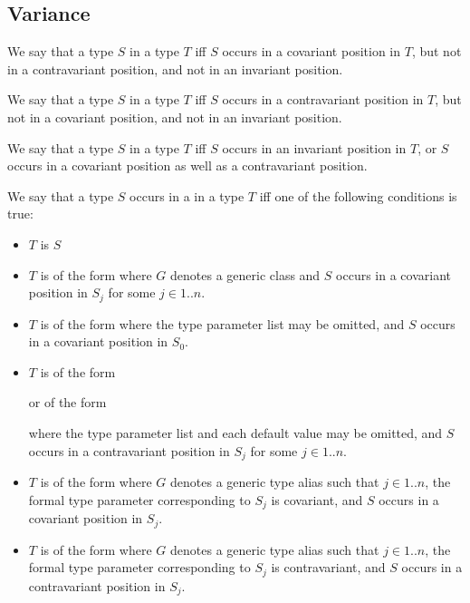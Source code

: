 \documentclass[makeidx]{article}
\begin{document}
\subsection{Variance}

\LMHash{}%
We say that a type $S$  in a type $T$ if{}f
$S$ occurs in a covariant position in $T$,
but not in a contravariant position,
and not in an invariant position.

\LMHash{}%
We say that a type $S$  in a type $T$ if{}f
$S$ occurs in a contravariant position in $T$,
but not in a covariant position,
and not in an invariant position.

\LMHash{}%
We say that a type $S$  in a type $T$ if{}f
$S$ occurs in an invariant position in $T$,
or $S$ occurs in a covariant position as well as a contravariant position.

\LMHash{}%
We say that a type $S$ occurs in a  in a type $T$
if{}f one of the following conditions is true:

\begin{itemize}
\item $T$ is $S$

\item $T$ is of the form 
  where $G$ denotes a generic class
  and $S$ occurs in a covariant position in $S_j$ for some $j \in 1 .. n$.

\item $T$ is of the form
  where the type parameter list may be omitted,
  and $S$ occurs in a covariant position in $S_0$.

\item $T$ is of the form



  \noindent
  or of the form



  \noindent
  where the type parameter list and each default value may be omitted,
  and $S$ occurs in a contravariant position in $S_j$
  for some $j \in 1 .. n$.

\item $T$ is of the form 
  where $G$ denotes a generic type alias such that
  $j \in 1 .. n$,
  the formal type parameter corresponding to $S_j$ is covariant,
  and $S$ occurs in a covariant position in $S_j$.

\item $T$ is of the form 
  where $G$ denotes a generic type alias such that
  $j \in 1 .. n$,
  the formal type parameter corresponding to $S_j$ is contravariant,
  and $S$ occurs in a contravariant position in $S_j$.
\end{itemize}
\end{document}
